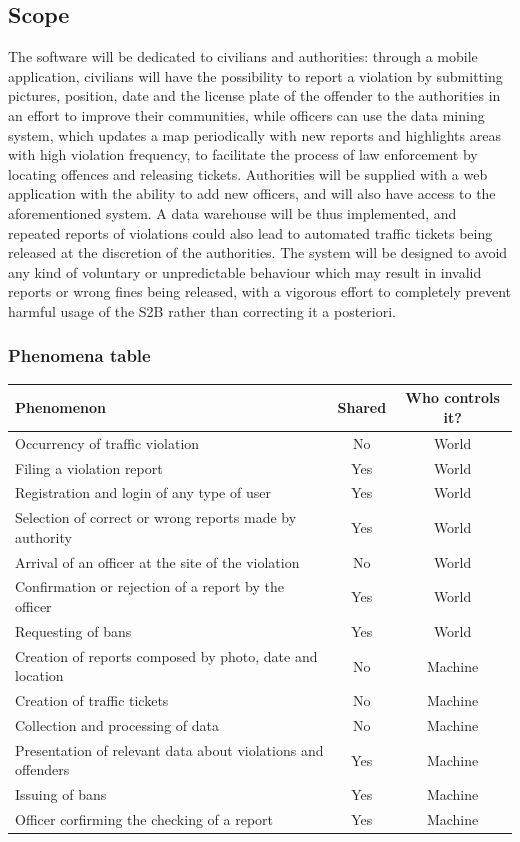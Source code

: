 \documentclass[12pt,a4paper]{article}
\begin{document}
\subsection{Scope}
The software will be dedicated to civilians and authorities: through a mobile application, civilians will have the possibility to report a violation by submitting pictures, position, date and the license plate of the offender to the authorities in an effort to improve their communities, while officers can use the data mining system, which updates a map periodically with new reports and highlights areas with high violation frequency, to facilitate the process of law enforcement by locating offences and releasing tickets. Authorities will be supplied with a web application with the ability to add new officers, and will also have access to the aforementioned system.
A data warehouse will be thus implemented, and repeated reports of violations could also lead to automated traffic tickets being released at the discretion of the authorities.
The system will be designed to avoid any kind of voluntary or unpredictable behaviour which may result in invalid reports or wrong fines being released, with a vigorous effort to completely prevent harmful usage of the S2B rather than correcting it a posteriori.
\newpage
\subsubsection{Phenomena table}
\FloatBarrier
\begin{center}
\begin{table}[h]
    \begin{tabular}{|l|c|c|}
    	  \hline
      \textbf{Phenomenon} & \textbf{Shared} & \textbf{Who controls it?} \\ \hline
	  Occurrency of traffic violation & No & World \\
	  Filing a violation report & Yes & World \\
	  Registration and login of any type of user & Yes & World \\
	  Selection of correct or wrong reports made by authority & Yes & World \\
	  Arrival of an officer at the site of the violation  & No & World \\
	  Confirmation or rejection of a report by the officer & Yes & World \\
 	  Requesting of bans & Yes & World \\
	  Creation of reports composed by photo, date and location & No & Machine \\
	  Creation of traffic tickets & No & Machine \\
	  Collection and processing of data & No & Machine \\
	  Presentation of relevant data about violations and offenders & Yes & Machine \\
	  Issuing of bans & Yes & Machine \\
	  Officer corfirming the checking of a report & Yes & Machine \\ \hline
    \end{tabular}
\end{table}
\end{center}
\FloatBarrier
\end{document}
